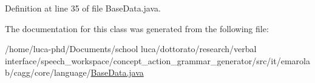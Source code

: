 Definition at line 35 of file Base\-Data.\-java.



The documentation for this class was generated from the following file\-:\begin{DoxyCompactItemize}
\item 
/home/luca-\/phd/\-Documents/school luca/dottorato/research/verbal interface/speech\-\_\-workspace/concept\-\_\-action\-\_\-grammar\-\_\-generator/src/it/emarolab/cagg/core/language/\hyperlink{BaseData_8java}{Base\-Data.\-java}\end{DoxyCompactItemize}
